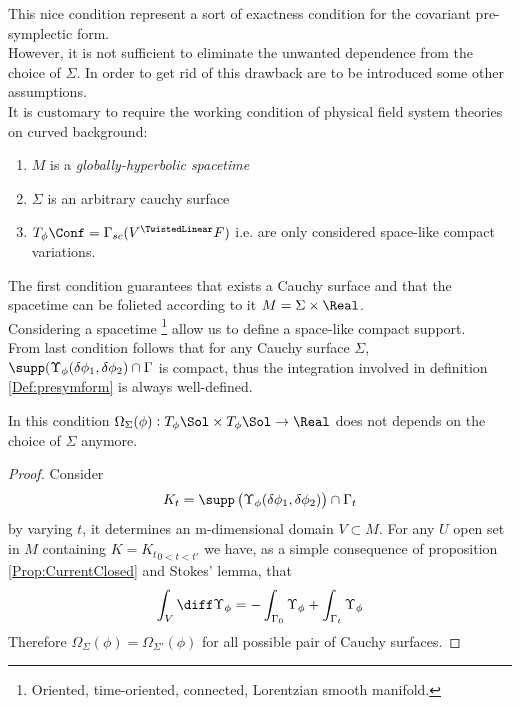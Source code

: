 \documentclass[a4paper,12pt,fleqn]{scrartcl}  %
\begin{document}
This nice condition represent a sort of exactness condition for the covariant pre-symplectic form.\\
However, it is not sufficient to eliminate the unwanted dependence from the choice of $\Sigma$.
In order to get rid of this drawback are to be introduced some other assumptions.\\
It is customary to require the working condition of physical field system theories on curved background:
\begin{enumerate}
	\item $M$ is a \emph{globally-hyperbolic spacetime}
	\item $\Sigma$ is an arbitrary cauchy surface
	\item $T_\phi \Conf =\Gamma_{sc} (V^\TwistedLinear F )$ i.e. are only considered space-like compact variations.
\end{enumerate}
The first condition guarantees that exists a Cauchy surface and that the spacetime can be folieted according to it $M= \Sigma \times \Real$.\\
Considering a spacetime \footnote{Oriented, time-oriented, connected, Lorentzian smooth manifold. } allow us to define a space-like compact support.\\
From last condition follows that for any Cauchy surface $\Sigma$, $ \supp(\Upsilon_\phi (\delta \phi_1, \delta \phi_2) \cap \Gamma$ is compact, thus the integration involved in definition \ref{Def:presymform} is always well-defined.

\begin{proposition}
	In this condition $\Omega_\Sigma (\phi): T_\phi \Sol \times T_\phi \Sol \rightarrow \Real$ does not depends on the choice of $\Sigma$ anymore.
\end{proposition}
\begin{proof}
	Consider 
	\begin{displaymath}
		K_t = \supp\left(\Upsilon_\phi (\delta \phi_1, \delta \phi_2) \right) \cap \Gamma_t
	\end{displaymath}
	by varying $t$, it determines an m-dimensional domain $V \subset M$.
	For any $U$ open set in $M$ containing $K={K_t}_{0<t<t'}$ we have, as a simple consequence of proposition \ref{Prop:CurrentClosed} and Stokes' lemma, that
	\begin{displaymath}
		\int_V \diff \Upsilon_\phi = - \int_{\Gamma_0} \Upsilon_\phi +\int_{\Gamma_t} \Upsilon_\phi 
	\end{displaymath}
	Therefore $\Omega_\Sigma (\phi) = \Omega_{\Sigma'} (\phi)$ for all possible pair of Cauchy surfaces.
\end{proof}
\end{document}
